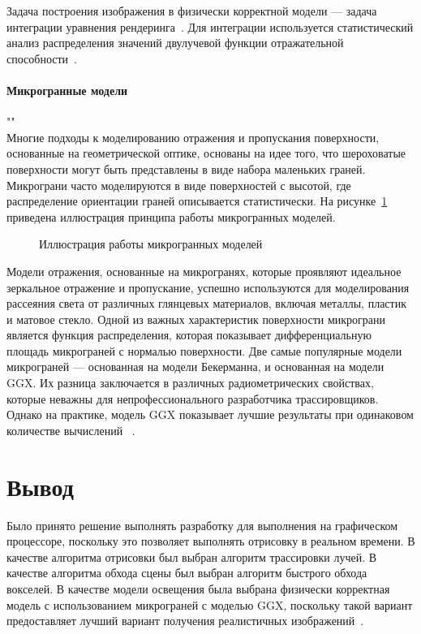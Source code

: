 Задача построения изображения в физически корректной модели --- задача 
интеграции уравнения рендеринга~\cite{EoR}. Для интеграции используется
статистический анализ распределения значений двулучевой функции отражательной 
способности~\cite{PBRT3e}.

\paragraph{Микрогранные модели}""\\
Многие подходы к моделированию отражения и пропускания поверхности, основанные 
на геометрической оптике, основаны на идее того, что шероховатые поверхности 
могут быть представлены в виде набора маленьких граней. Микрограни часто моделируются 
в виде поверхностей с высотой, где распределение ориентации граней описывается статистически.
На рисунке~\ref{img:microfacet} приведена иллюстрация принципа работы микрогранных моделей.

\begin{figure}[H]
  \centering
  
  \caption{Иллюстрация работы микрогранных моделей~\cite{PBRT3e}}
  \label{img:microfacet}
\end{figure}

Модели отражения, основанные на микрогранях, которые проявляют идеальное 
зеркальное отражение и пропускание, успешно используются для моделирования 
рассеяния света от различных глянцевых материалов, включая металлы, пластик 
и матовое стекло.
Одной из важных характеристик поверхности микрограни является функция 
распределения, которая показывает дифференциальную площадь микрограней 
с нормалью поверхности. Две самые популярные модели микрограней --- 
основанная на модели Бекерманна, и основанная на модели GGX. Их разница 
заключается в различных радиометрических свойствах, которые неважны
для непрофессионального разработчика трассировщиков. Однако на практике,
модель GGX показывает лучшие результаты при одинаковом количестве вычислений
~\cite{PBRT3e}\cite{MMfRtRS}.

\section*{Вывод}

Было принято решение выполнять разработку для выполнения на графическом процессоре,
поскольку это позволяет выполнять отрисовку в реальном времени.
В качестве алгоритма отрисовки был выбран алгоритм трассировки лучей.
В качестве алгоритма обхода сцены был выбран алгоритм быстрого обхода вокселей.
В качестве модели освещения была выбрана физически корректная модель с использованием
микрограней с моделью GGX, поскольку такой вариант предоставляет лучший вариант
получения реалистичных изображений~\cite{MMfRtRS}.
